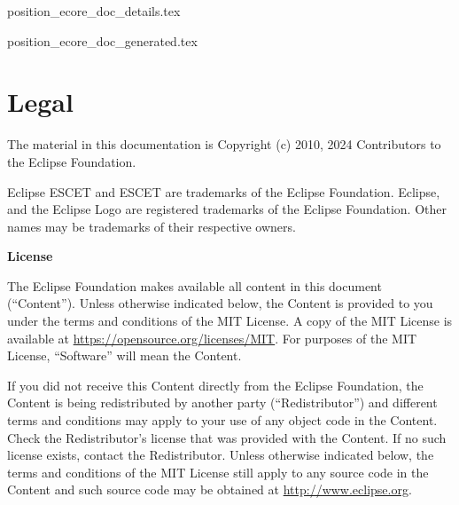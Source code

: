 \documentclass{report}
\begin{document}
\newpage


       {position_ecore_doc_details.tex}



       {position_ecore_doc_generated.tex}



\chapter{Legal}

The material in this documentation is
Copyright (c) 2010, 2024 Contributors to the Eclipse Foundation.

Eclipse ESCET and ESCET are trademarks of the Eclipse Foundation.
Eclipse, and the Eclipse Logo are registered trademarks of the
Eclipse Foundation. Other names may be trademarks of their
respective owners.

\textbf{License}

The Eclipse Foundation makes available all content in this document
(``Content''). Unless otherwise indicated below, the Content is provided to you
under the terms and conditions of the MIT License. A copy of the MIT License
is available at \url{https://opensource.org/licenses/MIT}. For purposes of the
MIT License, ``Software'' will mean the Content.

If you did not receive this Content directly from the Eclipse Foundation,
the Content is being redistributed by another party (``Redistributor'') and
different terms and conditions may apply to your use of any object code in
the Content. Check the Redistributor's license that was provided with the
Content. If no such license exists, contact the Redistributor. Unless
otherwise indicated below, the terms and conditions of the MIT License
still apply to any source code in the Content and such source code may be
obtained at \url{http://www.eclipse.org}.





\end{document}
